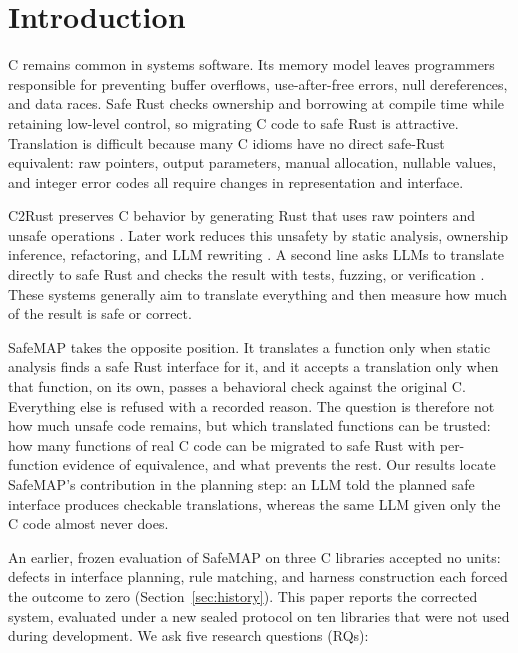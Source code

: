 \documentclass[pdflatex,sn-basic]{sn-jnl}
\newcommand{\tool}{SafeMAP\xspace}
\begin{document}
\section{Introduction}

C remains common in systems software. Its memory model leaves programmers
responsible for preventing buffer overflows, use-after-free errors, null
dereferences, and data races. Safe Rust checks ownership and borrowing at
compile time while retaining low-level control, so migrating C code to safe
Rust is attractive. Translation is difficult because many C idioms have no
direct safe-Rust equivalent: raw pointers, output parameters, manual
allocation, nullable values, and integer error codes all require changes in
representation and interface.

C2Rust preserves C behavior by generating Rust that uses raw pointers and
unsafe operations \citep{c2rust}. Later work reduces this unsafety by static
analysis, ownership inference, refactoring, and LLM rewriting
\citep{emre2021safer,hong2023static,zhang2023ownership,ling2022trust,
nitin2026c2saferrust,mohapatra2026cp2srust}. A second line asks LLMs to
translate directly to safe Rust and checks the result with tests, fuzzing, or
verification
\citep{hong2025typemigrating,zhou2025c2rusttv,eniser2025fluorine,
shetty2024syzygy,zhou2025sactor,yang2025vert,sim2026encrust,
shiraishi2026smartc2rust,farrukh2026safetrans,li2025actor}. These systems
generally aim to translate everything and then measure how much of the result
is safe or correct.

\tool takes the opposite position. It translates a function only when static
analysis finds a safe Rust interface for it, and it accepts a translation only
when that function, on its own, passes a behavioral check against the
original C. Everything else is refused with a recorded reason. The question
is therefore not how much unsafe code remains, but which translated functions
can be trusted: how many functions of real C code can be migrated to safe Rust
with per-function evidence of equivalence, and what prevents the rest. Our results locate \tool's contribution in the planning
step: an LLM told the planned safe interface produces checkable translations,
whereas the same LLM given only the C code almost never does.

An earlier, frozen evaluation of \tool on three C libraries accepted no
units: defects in interface planning, rule matching, and harness construction
each forced the outcome to zero (Section~\ref{sec:history}). This paper
reports the corrected system, evaluated under a new sealed protocol on ten
libraries that were not used during development. We ask five research
questions (RQs):
\end{document}
